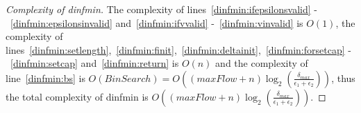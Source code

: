 \begin{proof}[Complexity of dinfmin]
   The complexity of lines~\ref{dinfmin:ifepsilonsvalid} -~\ref{dinfmin:epsilonsinvalid} and~\ref{dinfmin:ifvvalid}
   -~\ref{dinfmin:vinvalid} is $O\left(1\right)$, the complexity of
   lines~\ref{dinfmin:setlength},~\ref{dinfmin:finit},~\ref{dinfmin:deltainit},~\ref{dinfmin:forsetcap}
   -~\ref{dinfmin:setcap} and~\ref{dinfmin:return} is $O\left(n\right)$ and the complexity of line~\ref{dinfmin:bs} is
   $O\left(BinSearch\right) = O\left(\left(maxFlow + n\right) \log_2\left(\frac{\delta_{max}}{\epsilon_1 +
   \epsilon_2}\right)\right)$, thus the total complexity of dinfmin is $O\left(\left(maxFlow +
   n\right)\log_2\left(\frac{\delta_{max}}{\epsilon_1 + \epsilon_2}\right)\right)$.
\end{proof}
